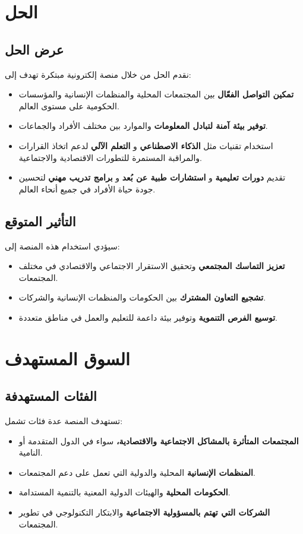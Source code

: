 \documentclass[12pt]{article}
\begin{document}
\section {\textcolor{sectionColor}{الحل}}
\subsection*{\textcolor{sectionColor}{عرض الحل}}
نقدم الحل من خلال منصة إلكترونية مبتكرة تهدف إلى:
\begin{itemize}
    \item \textbf{تمكين التواصل الفعّال} بين المجتمعات المحلية والمنظمات الإنسانية والمؤسسات الحكومية على مستوى العالم.
    \item \textbf{توفير بيئة آمنة لتبادل المعلومات} والموارد بين مختلف الأفراد والجماعات.
    \item استخدام تقنيات مثل \textbf{الذكاء الاصطناعي} و \textbf{التعلم الآلي} لدعم اتخاذ القرارات والمراقبة المستمرة للتطورات الاقتصادية والاجتماعية.
    \item تقديم \textbf{دورات تعليمية} و \textbf{استشارات طبية عن بُعد} و \textbf{برامج تدريب مهني} لتحسين جودة حياة الأفراد في جميع أنحاء العالم.
\end{itemize}

\subsection*{\textcolor{sectionColor}{التأثير المتوقع}}
سيؤدي استخدام هذه المنصة إلى:
\begin{itemize}
    \item \textbf{تعزيز التماسك المجتمعي} وتحقيق الاستقرار الاجتماعي والاقتصادي في مختلف المجتمعات.
    \item \textbf{تشجيع التعاون المشترك} بين الحكومات والمنظمات الإنسانية والشركات.
    \item \textbf{توسيع الفرص التنموية} وتوفير بيئة داعمة للتعليم والعمل في مناطق متعددة.
\end{itemize}

\section {\textcolor{sectionColor}{السوق المستهدف}}
\subsection*{\textcolor{sectionColor}{الفئات المستهدفة}}
تستهدف المنصة عدة فئات تشمل:
\begin{itemize}
    \item \textbf{المجتمعات المتأثرة بالمشاكل الاجتماعية والاقتصادية،} سواء في الدول المتقدمة أو النامية.
    \item \textbf{المنظمات الإنسانية} المحلية والدولية التي تعمل على دعم المجتمعات.
    \item \textbf{الحكومات المحلية} والهيئات الدولية المعنية بالتنمية المستدامة.
    \item \textbf{الشركات التي تهتم بالمسؤولية الاجتماعية} والابتكار التكنولوجي في تطوير المجتمعات.
\end{itemize}
\end{document}
